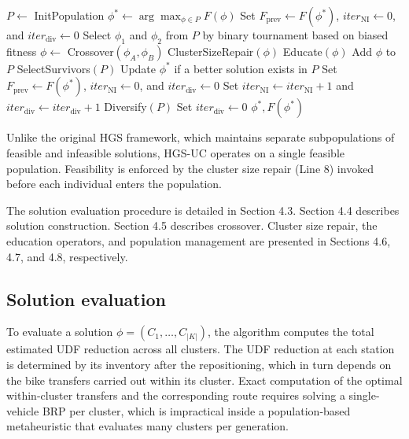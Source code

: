 \documentclass[11pt]{article}
\numberwithin{table}{section}
\numberwithin{figure}{section}
\begin{document}
\begin{algorithm}[htbp]
\caption{HGS-UC}
\label{alg:hgs-uc}
\begin{algorithmic}[1]
\State $P\leftarrow$ InitPopulation
\State $\phi^{*}\leftarrow \arg\max_{\phi\in P}F(\phi)$
\State Set $F_{\text{prev}}\leftarrow F(\phi^{*})$, $iter_{\text{NI}}\leftarrow 0$, and $iter_{\text{div}}\leftarrow 0$
\State Select $\phi_{1}$ and $\phi_{2}$ from $P$ by binary tournament based on biased fitness
\State $\phi\leftarrow$ Crossover$(\phi_A,\phi_B)$
\State ClusterSizeRepair$(\phi)$
\State Educate$(\phi)$
\State Add $\phi$ to $P$
\EndFor
{}
\State SelectSurvivors$(P)$
\EndIf
\State Update $\phi^{*}$ if a better solution exists in $P$
\State Set $F_{\text{prev}}\leftarrow F(\phi^{*})$, $iter_{\text{NI}}\leftarrow 0$, and $iter_{\text{div}}\leftarrow 0$
\Else
\State Set $iter_{\text{NI}}\leftarrow iter_{\text{NI}}+1$ and $iter_{\text{div}}\leftarrow iter_{\text{div}}+1$
\EndIf
{}
\State Diversify$(P)$
\State Set $iter_{\text{div}}\leftarrow 0$
\EndIf
\EndWhile
\State \Return $\phi^{*},F(\phi^{*})$
\end{algorithmic}
\end{algorithm}

Unlike the original HGS framework, which maintains separate subpopulations of feasible and infeasible solutions, HGS-UC operates on a single feasible population. Feasibility is enforced by the cluster size repair (Line 8) invoked before each individual enters the population.

The solution evaluation procedure is detailed in Section 4.3. Section 4.4 describes solution construction. Section 4.5 describes crossover. Cluster size repair, the education operators, and population management are presented in Sections 4.6, 4.7, and 4.8, respectively.

\subsection{Solution evaluation}

To evaluate a solution $\phi =({{C}_{1}},\ldots ,{{C}_{\left| K \right|}})$, the algorithm computes the total estimated UDF reduction across all clusters. The UDF reduction at each station is determined by its inventory after the repositioning, which in turn depends on the bike transfers carried out within its cluster. Exact computation of the optimal within-cluster transfers and the corresponding route requires solving a single-vehicle BRP per cluster, which is impractical inside a population-based metaheuristic that evaluates many clusters per generation.
\end{document}
